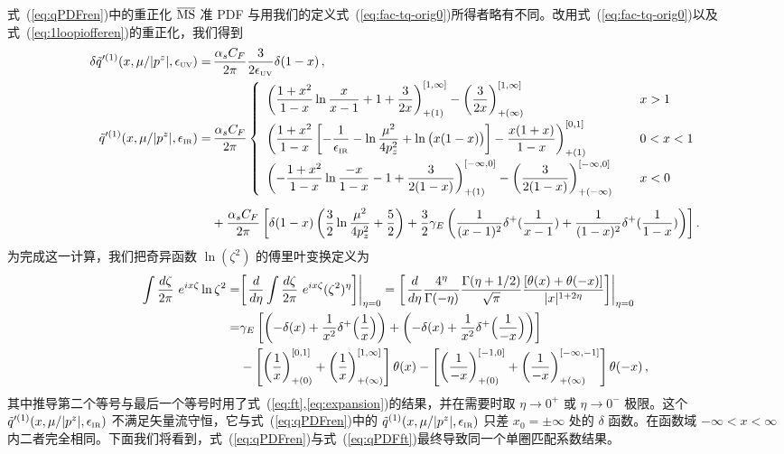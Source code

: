 \begin{widetext}
式~(\ref{eq:qPDFren})中的重正化 $\overline{\rm MS}$ 准 PDF 与用我们的定义式~(\ref{eq:fac-tq-orig0})所得者略有不同。改用式~(\ref{eq:fac-tq-orig0})以及式~(\ref{eq:1loopiofferen})的重正化\spcorr，我们得到
\begin{align}\label{eq:qPDFft}
\delta \tilde{q}'^{(1)}(x,\mu/|p^z|,\epsilon_{\mbox{\tiny UV}})
=&\,  {\alpha_sC_F\over 2\pi} {3\over 2\epsilon_{\mbox{\tiny UV}}}\delta(1-x)\,, \\
\tilde{q}'^{(1)}(x,\mu/|p^z|,\epsilon_{\mbox{\tiny IR}})
=&\, {\alpha_sC_F\over 2\pi}\left\{
\begin{array}{ll}
\displaystyle \left({1+x^2\over 1-x}\ln {x\over x-1} + 1 + {3\over 2x}\right)^{[1,\infty]}_{+(1)}- \left({3\over 2x}\right)^{[1,\infty]}_{+(\infty)} &\, x>1\\[10pt]
\displaystyle \left({1+x^2\over 1-x}\left[- {1\over \epsilon_{\mbox{\tiny IR}}} - \ln{\mu^2\over 4p_z^2} + \ln\big(x(1-x)\big)\right] - {x(1+x)\over 1-x}\right)^{[0,1]}_{+(1)}  &\, 0<x<1\\[10pt]
\displaystyle  \left(-{1+x^2\over 1-x}\ln {-x\over 1-x} - 1 + {3\over 2(1-x)}\right)^{[-\infty,0]}_{+(1)} - \left({3\over 2(1-x)}\right)^{[-\infty,0]}_{+(-\infty)} \quad &\, x<0
\end{array}\right.\nonumber\\[5pt]
& + {\alpha_sC_F\over 2\pi}\left[\delta(1-x)\left( {3\over2}\ln{\mu^2\over 4p_z^2} + {5\over2}\right) +{3\over2}\gamma_E\left({1\over(x-1)^2}\delta^+({1\over x-1}) + {1\over(1-x)^2}\delta^+({1\over 1-x})\right)\right]
 \nonumber .
\end{align}
为完成这一计算，我们把奇异函数 $\ln(\zeta^2)$ 的傅里叶变换定义为
\begin{align} \label{eq:subtlety}
\int {d\zeta\over 2\pi}\ e^{i x \zeta} \ln\zeta^2
= & \biggl[ \left.{d\over d\eta} \int {d\zeta\over 2\pi}\ e^{i x \zeta} (\zeta^2)^\eta \biggr] \right|_{\eta=0}
=\biggl[ \left.{d\over d\eta} {4^\eta\over \Gamma(-\eta)} {\Gamma(\eta+1/2)\over \sqrt{\pi}} {[\theta(x)+\theta(-x)]\over |x|^{1+2\eta}} \biggr]
\right|_{\eta=0}\\
=& \gamma_E \left[\left(-\delta(x) + {1\over x^2} \delta^+\Big({1\over x}\Big)\right) + \left(-\delta(x) + {1\over x^2} \delta^+\Big({1\over -x}\Big)\right)\right] \nonumber\\
& -\left[\left({1\over x}\right)_{+(0)}^{[0,1]} + \left({1\over x}\right)_{+(\infty)}^{[1,\infty]}\right]\theta(x) - \left[\left({1\over -x}\right)_{+(0)}^{[-1,0]} + \left({1\over -x}\right)_{+(\infty)}^{[-\infty,-1]}\right]\theta(-x)\,,\nonumber
\end{align}
其中推导第二个等号与最后一个等号时用了式~(\ref{eq:ft},\ref{eq:expansion})的结果，并在需要时取 $\eta\to 0^+$ 或 $\eta\to 0^-$ 极限。这个 $\tilde{q}'^{(1)}(x,\mu/|p^z|,\epsilon_{\mbox{\tiny IR}})$ 不满足矢量流守恒，它与式~(\ref{eq:qPDFren})中的 $\tilde{q}^{(1)}(x,\mu/|p^z|,\epsilon_{\mbox{\tiny IR}})$ 只差 $x_0=\pm\infty$ 处的 $\delta$ 函数。在函数域 $-\infty < x < \infty$ 内二者完全相同。下面我们将看到，式~(\ref{eq:qPDFren})与式~(\ref{eq:qPDFft})最终导致同一个单圈匹配系数结果。



\end{widetext}
